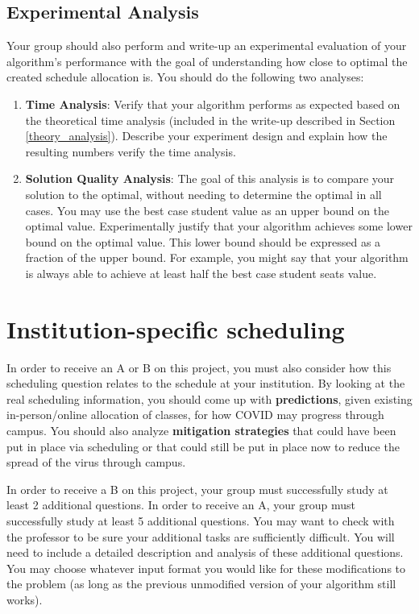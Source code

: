 \documentclass[12pt]{article}
\begin{document}
\subsection{Experimental Analysis}
\label{exp_analysis}
Your group should also perform and write-up an experimental evaluation of your algorithm's performance with the goal of understanding how close to optimal the created schedule allocation is. You should do the following two analyses:

\begin{enumerate}
\item \textbf{Time Analysis}: Verify that your algorithm performs as expected based on the theoretical time analysis (included in the write-up described in Section \ref{theory_analysis}). Describe your experiment design and explain how the resulting numbers verify the time analysis.
\item \textbf{Solution Quality Analysis}: The goal of this analysis is to compare your solution to the optimal, without needing to determine the optimal in all cases. You may use the best case student value as an upper bound on the optimal value. Experimentally justify that your algorithm achieves some lower bound on the optimal value. This lower bound should be expressed as a fraction of the upper bound. For example, you might say that your algorithm is always able to achieve at least half the best case student seats value.
\end{enumerate}


\section{Institution-specific scheduling}
\label{additional_tasks}
In order to receive an A or B on this project, you must also consider how this scheduling question relates to the schedule at your institution.  By looking at the real scheduling information, you should come up with \textbf{predictions}, given existing in-person/online allocation of classes, for how COVID may progress through campus.  You should also analyze \textbf{mitigation strategies} that could have been put in place via scheduling or that could still be put in place now to reduce the spread of the virus through campus.

In order to receive a B on this project, your group must successfully study at least 2 additional questions.  In order to receive an A, your group must successfully study at least 5 additional questions.  
You may want to check with the professor to be sure your additional tasks are sufficiently difficult.  
You will need to include a detailed description and analysis of these additional questions.
You may choose whatever input format you would like for these modifications to the problem (as long as the previous unmodified version of your algorithm still works).  
\end{document}
